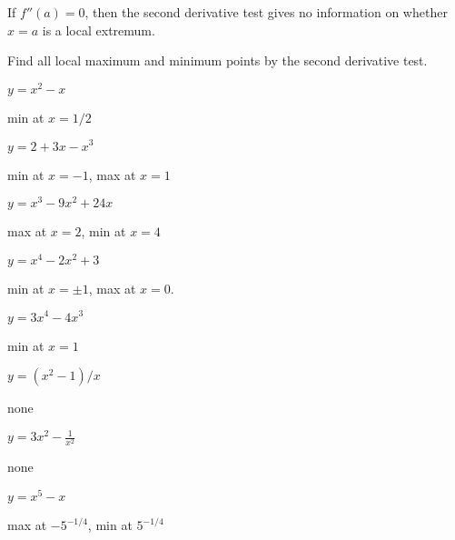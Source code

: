 \begin{warning}
If $f''(a)=0$, then the second derivative test gives no information on
whether $x=a$ is a local extremum. 
\end{warning}






\begin{exercises}
Find all local maximum and minimum points by the second derivative
test. 

\twocol
\begin{exercise} $y=x^2-x$ 
\begin{answer} min at $x=1/2$
\end{answer}\end{exercise}

\begin{exercise} $y=2+3x-x^3$ 
\begin{answer} min at $x=-1$, max at $x=1$
\end{answer}\end{exercise}

\begin{exercise} $y=x^3-9x^2+24x$
\begin{answer} max at $x=2$, min at $x=4$
\end{answer}\end{exercise}

\begin{exercise} $y=x^4-2x^2+3$ 
\begin{answer} min at $x=\pm 1$, max at $x=0$.
\end{answer}\end{exercise}

\begin{exercise} $y=3x^4-4x^3$
\begin{answer} min at $x=1$
\end{answer}\end{exercise}

\begin{exercise} $y=(x^2-1)/x$
\begin{answer} none
\end{answer}\end{exercise}

\begin{exercise} $y=3x^2-\frac{1}{x^2}$ 
\begin{answer} none
\end{answer}\end{exercise}

\begin{exercise} $y= x^5 - x$
\begin{answer} max at $-5^{-1/4}$, min at $5^{-1/4}$
\end{answer}\end{exercise}


\end{exercises}
